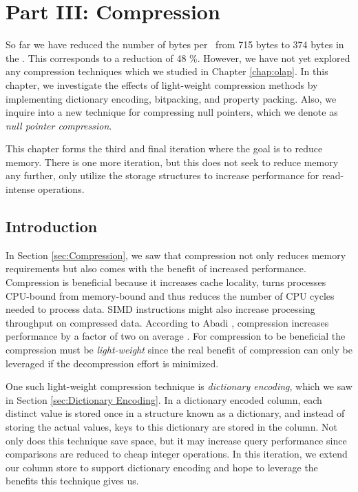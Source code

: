 \chapter{Part III: Compression}
\label{chap:compression}
So far we have reduced the number of bytes per \lineitem~from 715 bytes to 374 bytes in the \tpchdl. This corresponds to a reduction of 48 \%. However, we have not yet explored any compression techniques which we studied in Chapter \ref{chap:olap}. In this chapter, we investigate the effects of light-weight compression methods by implementing dictionary encoding, bitpacking, and property packing. Also, we inquire into a new technique for compressing null pointers, which we denote as \textit{null pointer compression}. 

This chapter forms the third and final iteration where the goal is to reduce memory. There is one more iteration, but this does not seek to reduce memory any further, only utilize the storage structures to increase performance for read-intense operations.

\clearpage

\section{Introduction}
\label{sec:Introduction}
In Section \ref{sec:Compression}, we saw that compression not only reduces memory requirements but also comes with the benefit of increased performance. Compression is beneficial because it increases cache locality, turns processes CPU-bound from memory-bound and thus reduces the number of CPU cycles needed to process data. SIMD instructions might also increase processing throughput on compressed data. According to Abadi \ea, compression increases performance by a factor of two on average \cite{Abadi2008-dd}. For compression to be beneficial the compression must be \textit{light-weight} since the real benefit of compression can only be leveraged if the decompression effort is minimized.

One such light-weight compression technique is \textit{dictionary encoding}, which we saw in Section \ref{sec:Dictionary Encoding}. In a dictionary encoded column, each distinct value is stored once in a structure known as a dictionary, and instead of storing the actual values, keys to this dictionary are stored in the column. Not only does this technique save space, but it may increase query performance since comparisons are reduced to cheap integer operations. In this iteration, we extend our column store to support dictionary encoding and hope to leverage the benefits this technique gives us.

